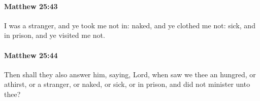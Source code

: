 		\paragraph{Matthew 25:43} %
			\label{MATTHEW-25-43}

			I was a stranger, and ye took me not in: naked, and ye clothed me not: sick, and in prison, and ye visited me not.

			\begin{framed}
			\scriptsize
				\begin{compactdesc}
					\item[SBLG] 
				\end{compactdesc}
			\end{framed}

		\paragraph{Matthew 25:44} %
			\label{MATTHEW-25-44}

			Then shall they also answer him, saying, Lord, when saw we thee an hungred, or athirst, or a stranger, or naked, or sick, or in prison, and did not minister unto thee?


